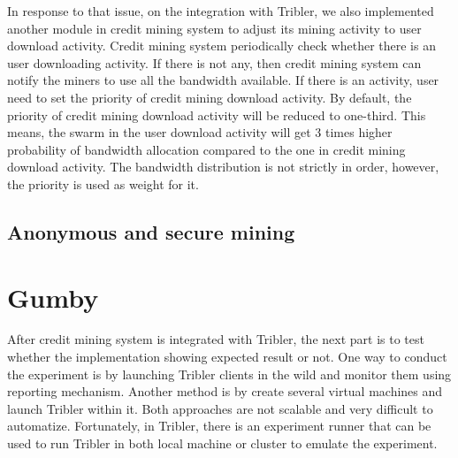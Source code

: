 In response to that issue, on the integration with Tribler, we also implemented another module in credit mining system to adjust its mining activity to user download activity. Credit mining system periodically check whether there is an user downloading activity. If there is not any, then credit mining system can notify the miners to use all the bandwidth available. If there is an activity, user need to set the priority of credit mining download activity. By default, the priority of credit mining download activity will be reduced to one-third. This means, the swarm in the user download activity will get 3 times higher probability of bandwidth allocation compared to the one in credit mining download activity. The bandwidth distribution is not strictly in order, however, the priority is used as weight for it.


\subsection{Anonymous and secure mining}


\section{Gumby}
\label{section:gumby}
After credit mining system is integrated with Tribler, the next part is to test whether the implementation showing expected result or not. One way to conduct the experiment is by launching Tribler clients in the wild and monitor them using reporting mechanism. Another method is by create several virtual machines and launch Tribler within it. Both approaches are not scalable and very difficult to automatize. Fortunately, in Tribler, there is an experiment runner that can be used to run Tribler in both local machine or cluster to emulate the experiment.

